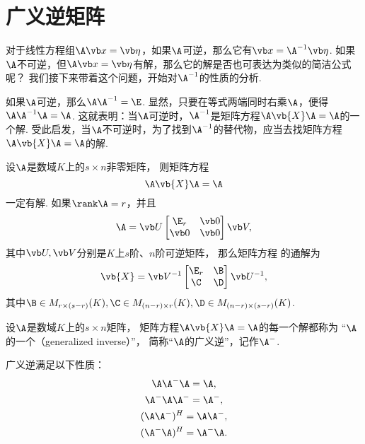 \section{广义逆矩阵}
对于线性方程组\(\A\x=\b\)，如果\(\A\)可逆，那么它有\(\x=\A^{-1}\b\).
如果\(\A\)不可逆，但\(\A\x=\b\)有解，那么它的解是否也可表达为类似的简洁公式呢？
我们接下来带着这个问题，开始对\(\A^{-1}\)的性质的分析.

如果\(\A\)可逆，那么\(\A\A^{-1}=\E\).
显然，只要在等式两端同时右乘\(\A\)，便得\(\A\A^{-1}\A=\A\).
这就表明：当\(\A\)可逆时，\(\A^{-1}\)是矩阵方程\(\A \vb{X} \A = \A\)的一个解.
受此启发，当\(\A\)不可逆时，为了找到\(\A^{-1}\)的替代物，应当去找矩阵方程\(\A \vb{X} \A = \A\)的解.

\begin{theorem}[广义逆存在定理]\label{theorem:线性方程组.广义逆1}
设\(\A\)是数域\(K\)上的\(s \times n\)非零矩阵，
则矩阵方程\begin{equation}\label{equation:线性方程组.广义逆1矩阵方程}
	\A \vb{X} \A = \A
\end{equation}一定有解.
如果\(\rank\A=r\)，并且\[
	\A
	= \P
	\begin{bmatrix}
		\E_r & \vb0 \\
		\vb0 & \vb0
	\end{bmatrix}
	\Q,
\]
其中\(\P,\Q\)分别是\(K\)上\(s\)阶、\(n\)阶可逆矩阵，
那么矩阵方程  的通解为
\begin{equation}\label{equation:线性方程组.广义逆1矩阵方程的通解}
	\vb{X} = \Q^{-1} \begin{bmatrix} \E_r & \B \\ \C & \D \end{bmatrix} \P^{-1},
\end{equation}
其中\(\B\in M_{r\times(s-r)}(K),
\C\in M_{(n-r)\times r}(K),
\D\in M_{(n-r)\times(s-r)}(K)\).
\end{theorem}

\begin{definition}
设\(\A\)是数域\(K\)上的\(s \times n\)矩阵，
矩阵方程\(\A \vb{X} \A = \A\)的每一个解都称为
“\(\A\)的一个（generalized inverse）”，
简称“\(\A\)的广义逆”，记作\(\A^-\).
\end{definition}

\begin{property}\label{theorem:线性方程组.广义逆的性质1}
广义逆满足以下性质：\begin{gather}
	\A\A^-\A=\A, \\
	\A^-\A\A^-=\A^-, \\
	(\A\A^-)^H=\A\A^-, \\
	(\A^-\A)^H=\A^-\A.
\end{gather}
\end{property}

